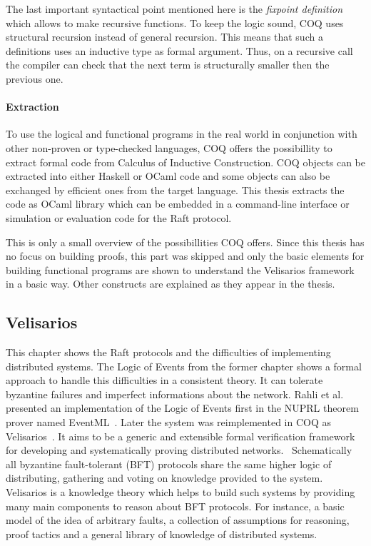The last important syntactical point mentioned here is the \textit{fixpoint definition}
which allows to make recursive functions. To keep the logic sound, COQ uses
structural recursion instead of general recursion. This means that
such a definitions uses an inductive type as formal argument.
Thus, on a recursive call the compiler can check that the next
term is structurally smaller then the previous one.~\cite{paulin2011introduction}

\paragraph{Extraction}
To use the logical and functional programs in the real world in conjunction
with other non-proven or type-checked languages, COQ offers
the possibillity to extract formal code from Calculus of Inductive Construction.
COQ objects can be extracted into either Haskell or OCaml code and
some objects can also be exchanged by efficient ones from the target
language. This thesis extracts the code as OCaml library which can be
embedded in a command-line interface or simulation or evaluation
code for the Raft protocol.~\cite{the_coq_development_team_2019_2554024}

This is only a small overview of the possibillities COQ offers. Since
this thesis has no focus on building proofs, this part was skipped and
only the basic elements for building functional programs are shown to
understand the Velisarios framework in a basic way. Other constructs
are explained as they appear in the thesis.


\subsection{Velisarios}
This chapter shows the Raft protocols and the difficulties of
implementing distributed systems. The Logic of Events from the former
chapter shows a formal approach to handle this difficulties in
a consistent theory. It can tolerate byzantine failures and
imperfect informations about the network. Rahli et al. presented
an implementation of the Logic of Events first in the NUPRL
theorem prover named EventML~\cite{rahli2017eventml}. Later
the system was reimplemented in COQ as Velisarios~\cite{rahli2018velisarios}.
It aims to be a generic and extensible formal verification framework
for developing and systematically proving distributed networks.~\cite{rahli2018velisarios}
Schematically all byzantine fault-tolerant (BFT) protocols share the same
higher logic of distributing, gathering and voting on knowledge
provided to the system. Velisarios is a knowledge theory which
helps to build such systems by providing many main components
to reason about BFT protocols. For instance, a basic model
of the idea of arbitrary faults, a collection of assumptions
for reasoning, proof tactics and a general library of
knowledge of distributed systems.~\cite{rahli2018velisarios}

